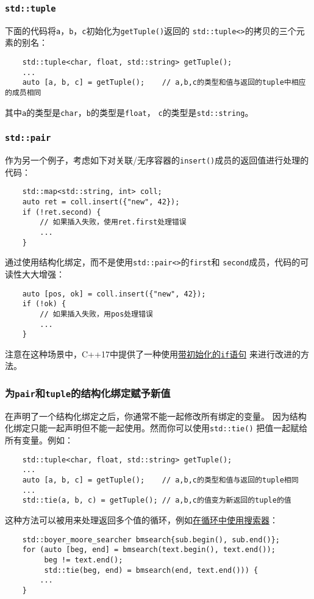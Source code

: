 \subsubsection*{\texttt{std::tuple}}
下面的代码将\texttt{a}，\texttt{b}，\texttt{c}初始化为\texttt{getTuple()}返回的
\texttt{std::tuple<>}的拷贝的三个元素的别名：
\begin{lstlisting}
    std::tuple<char, float, std::string> getTuple();
    ...
    auto [a, b, c] = getTuple();    // a,b,c的类型和值与返回的tuple中相应的成员相同
\end{lstlisting}
其中\texttt{a}的类型是\texttt{char}，\texttt{b}的类型是\texttt{float}，
\texttt{c}的类型是\texttt{std::string}。

\subsubsection*{\texttt{std::pair}}
作为另一个例子，考虑如下对关联/无序容器的\texttt{insert()}成员的返回值进行处理的代码：
\begin{lstlisting}
    std::map<std::string, int> coll;
    auto ret = coll.insert({"new", 42});
    if (!ret.second) {
        // 如果插入失败，使用ret.first处理错误
        ...
    }
\end{lstlisting}
通过使用结构化绑定，而不是使用\texttt{std::pair<>}的\texttt{first}和
\texttt{second}成员，代码的可读性大大增强：
\begin{lstlisting}
    auto [pos, ok] = coll.insert({"new", 42});
    if (!ok) {
        // 如果插入失败，用pos处理错误
        ...
    }
\end{lstlisting}
注意在这种场景中，C++17中提供了一种使用\hyperref[ch2]{带初始化的\texttt{if}语句}
来进行改进的方法。

\subsubsection*{为\texttt{pair}和\texttt{tuple}的结构化绑定赋予新值}
在声明了一个结构化绑定之后，你通常不能一起修改所有绑定的变量。
因为结构化绑定只能一起声明但不能一起使用。然而你可以使用\texttt{std::tie()}
把值一起赋给所有变量。例如：
\begin{lstlisting}
    std::tuple<char, float, std::string> getTuple();
    ...
    auto [a, b, c] = getTuple();    // a,b,c的类型和值与返回的tuple相同
    ...
    std::tie(a, b, c) = getTuple(); // a,b,c的值变为新返回的tuple的值
\end{lstlisting}
这种方法可以被用来处理返回多个值的循环，例如\hyperref[ch24.1.2]{在循环中使用搜索器}：
\begin{lstlisting}
    std::boyer_moore_searcher bmsearch{sub.begin(), sub.end()};
    for (auto [beg, end] = bmsearch(text.begin(), text.end());
         beg != text.end();
         std::tie(beg, end) = bmsearch(end, text.end())) {
        ...
    }
\end{lstlisting}


